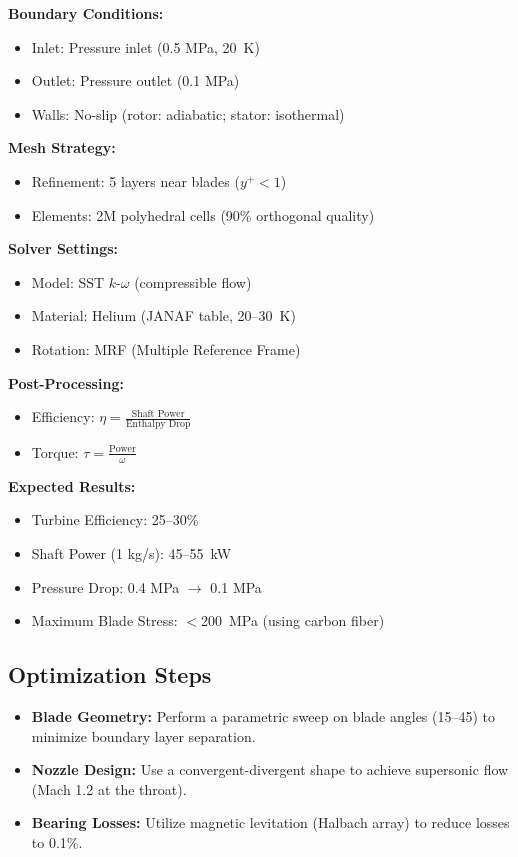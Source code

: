 \documentclass[12pt]{article}
\begin{document}
\textbf{Boundary Conditions:}
\begin{itemize}
    \item Inlet: Pressure inlet (0.5 MPa, 20~K)
    \item Outlet: Pressure outlet (0.1 MPa)
    \item Walls: No-slip (rotor: adiabatic; stator: isothermal)
\end{itemize}

\textbf{Mesh Strategy:}
\begin{itemize}
    \item Refinement: 5 layers near blades ($y^+ < 1$)
    \item Elements: 2M polyhedral cells (90\% orthogonal quality)
\end{itemize}

\textbf{Solver Settings:}
\begin{itemize}
    \item Model: SST $k$-$\omega$ (compressible flow)
    \item Material: Helium (JANAF table, 20--30~K)
    \item Rotation: MRF (Multiple Reference Frame)
\end{itemize}

\textbf{Post-Processing:}
\begin{itemize}
    \item Efficiency: $\eta = \frac{\text{Shaft Power}}{\text{Enthalpy Drop}}$
    \item Torque: $\tau = \frac{\text{Power}}{\omega}$
\end{itemize}

\textbf{Expected Results:}
\begin{itemize}
    \item Turbine Efficiency: 25--30\%
    \item Shaft Power (1 kg/s): 45--55~kW
    \item Pressure Drop: 0.4 MPa $\rightarrow$ 0.1 MPa
    \item Maximum Blade Stress: $<$200~MPa (using carbon fiber)
\end{itemize}

\subsection{Optimization Steps}
\begin{itemize}
    \item \textbf{Blade Geometry:} Perform a parametric sweep on blade angles (15\textdegree--45\textdegree) to minimize boundary layer separation.
    \item \textbf{Nozzle Design:} Use a convergent-divergent shape to achieve supersonic flow (Mach 1.2 at the throat).
    \item \textbf{Bearing Losses:} Utilize magnetic levitation (Halbach array) to reduce losses to 0.1\%.
\end{itemize}
\end{document}
